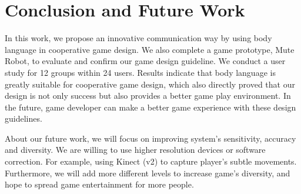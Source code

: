 \documentclass{sigchi}
\begin{document}

\section{Conclusion and Future Work}

In this work, we propose an innovative communication way by using body language in cooperative game design. We also complete a game prototype, Mute Robot, to evaluate and confirm our game design guideline. We conduct a user study for 12 groups within 24 users. Results indicate that body language is greatly suitable for cooperative game design, which also directly proved that our design is not only success but also provides a better game play environment. In the future, game developer can make a better game experience with these design guidelines. 

About our future work, we will focus on improving system's sensitivity, accuracy and diversity. We are willing to use higher resolution devices or software correction. For example, using Kinect (v2) to capture player's subtle movements. Furthermore, 
we will add more different levels to increase game's diversity, and hope to spread game entertainment for more people.

\balance




\end{document}
